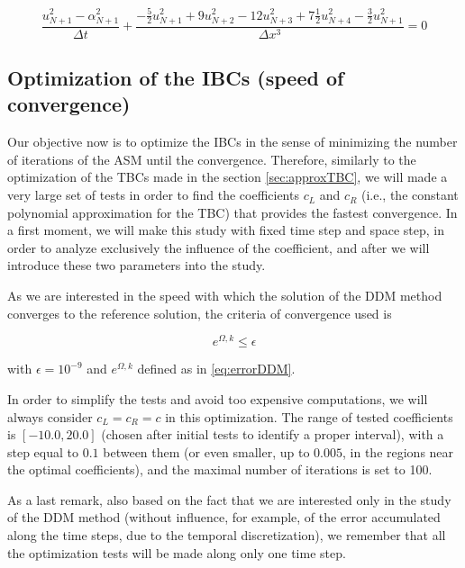 \begin{equation*}
    \label{eq:uncenteredFDdiscretizationN}
    \frac{u_{N+1}^2 - \alpha_{N+1}^2}{\Delta t} + \frac{-\frac{5}{2}u_{N+1}^2 + 9u_{N+2}^2 - 12 u_{N+3}^2 + 7\frac{1}{2}u_{N+4}^2 -\frac{3}{2}u_{N+1}^2}{\Delta x ^3} = 0
\end{equation*}

\subsection{Optimization of the IBCs (speed of convergence)}

\indent Our objective now is to optimize the IBCs in the sense of minimizing the number of iterations of the ASM until the convergence. Therefore, similarly to the optimization of the TBCs made in the section \ref{sec:approxTBC}, we will made a very large set of tests in order to find the coefficients $c_L$ and $c_R$ (i.e., the constant polynomial approximation for the TBC) that provides the fastest convergence. In a first moment, we will make this study with fixed time step and space step, in order to analyze exclusively the influence of the coefficient, and after we will introduce these two parameters into the study.

\indent As we are interested in the speed with which the solution of the DDM method converges to the reference solution, the criteria of convergence used is

\begin{equation*}
\label{eq:criteriaConvergence}
	e^{\Omega,k} \leq \epsilon
\end{equation*}

\noindent with $\epsilon = 10^{-9}$ and $e^{\Omega,k}$ defined as in \eqref{eq:errorDDM}.
 
\indent In order to simplify the tests and avoid too expensive computations, we will always consider $c_L = c_R = c$ in this optimization. The range of tested coefficients is $[-10.0, 20.0]$ (chosen after initial tests to identify a proper interval), with a step equal to  $0.1$ between them (or even smaller, up to $0.005$, in the regions near the optimal coefficients), and the maximal number of iterations is set to 100.

\indent As a last remark, also based on the fact that we are interested only in the study of the DDM method (without influence, for example, of the error accumulated along the time steps, due to the temporal discretization), we remember that all the optimization tests will be made along only one time step.


